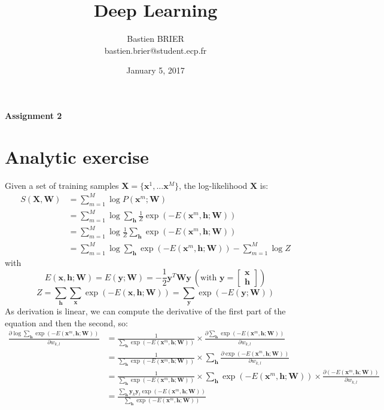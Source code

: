 \documentclass[11pt, oneside]{article}   	%
\title{Deep Learning}
\author{Bastien BRIER\\ bastien.brier@student.ecp.fr}
\date{January 5, 2017}				%
\begin{document}
\maketitle
\vspace{-10pt}
\begin{center}
{\LARGE \bf Assignment 2}\\
\vspace{10pt}
\end{center}

\section{Analytic exercise}
\vspace{4pt}
	
	Given a set of training samples $\mathbf X=\{\mathbf x^1,...\mathbf x^M\}$, the log-likelihood $\mathbf X$ is:
	\[\begin{split}
		S(\mathbf X,\mathbf W)&=\sum_{m=1}^M\log P(\mathbf x^m;\mathbf W)\\
		&=\sum_{m=1}^M\log\sum_\mathbf h\frac{1}{Z}\exp(-E(\mathbf x^m,\mathbf h;\mathbf W))\\
		&=\sum_{m=1}^M\log\frac{1}{Z}\sum_\mathbf h\exp(-E(\mathbf x^m,\mathbf h;\mathbf W))\\
		&=\sum_{m=1}^M\log\sum_\mathbf h\exp(-E(\mathbf x^m,\mathbf h;\mathbf W)) - \sum_{m=1}^M\log Z
	\end{split}\]
	with
		\[E(\mathbf x,\mathbf h;\mathbf W)=E(\mathbf y;\mathbf W)=-\frac{1}{2}\mathbf y^T\mathbf W\mathbf y\:(\text{with }\mathbf y=\begin{bmatrix}  \mathbf x \\ \mathbf h \end{bmatrix})\]
		\[Z=\sum_\mathbf h\sum_\mathbf x\exp(-E(\mathbf x,\mathbf h;\mathbf W)) = \sum_\mathbf y\exp(-E(\mathbf y;\mathbf W))\]	
	As derivation is linear, we can compute the derivative of the first part of the equation and then the second, so:
	\[\begin{split}
		\frac{\partial \log\sum_\mathbf h\exp(-E(\mathbf x^m,\mathbf h;\mathbf W))}{\partial w_{k,l}}&=\frac{1}{\sum_\mathbf h\exp(-E(\mathbf x^m,\mathbf h;\mathbf W))}\times \frac{\partial \sum_\mathbf h\exp(-E(\mathbf x^m,\mathbf h;\mathbf W))}{\partial w_{k,l}}\\
		&=\frac{1}{\sum_\mathbf h\exp(-E(\mathbf x^m,\mathbf h;\mathbf W))}\times \sum_\mathbf h \frac{\partial \exp(-E(\mathbf x^m,\mathbf h;\mathbf W))}{\partial w_{k,l}}\\
		&=\frac{1}{\sum_\mathbf h\exp(-E(\mathbf x^m,\mathbf h;\mathbf W))}\times \sum_\mathbf h \exp(-E(\mathbf x^m,\mathbf h;\mathbf W))\times \frac{\partial (-E(\mathbf x^m,\mathbf h;\mathbf W))}{\partial w_{k,l}}\\
		&=\frac{\sum_\mathbf h\mathbf y_{k}\mathbf y_{l}\exp(-E(\mathbf x^m,\mathbf h;\mathbf W))}{\sum_\mathbf h\exp(-E(\mathbf x^m,\mathbf h;\mathbf W))}\\
	\end{split}\]
\end{document}
